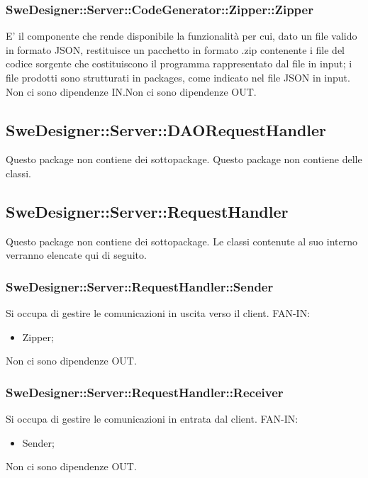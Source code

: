 \documentclass[../PianoDiQualifica.tex]{subfiles}
\begin{document}
		\subsubsection{SweDesigner::Server::CodeGenerator::Zipper::Zipper}
		E' il componente che rende disponibile la funzionalità per cui, dato un file valido in formato JSON, restituisce un pacchetto in formato .zip contenente i file del codice sorgente che costituiscono il programma rappresentato dal file in input; i file prodotti sono strutturati in packages, come indicato nel file JSON in input.
		Non ci sono dipendenze IN.Non ci sono dipendenze OUT.\subsection{SweDesigner::Server::DAORequestHandler}
		Questo package non contiene dei sottopackage.
		Questo package non contiene delle classi.
		\subsection{SweDesigner::Server::RequestHandler}
		Questo package non contiene dei sottopackage.
		Le classi contenute al suo interno verranno elencate qui di seguito.
		\subsubsection{SweDesigner::Server::RequestHandler::Sender}
		Si occupa di gestire le comunicazioni in uscita verso il client.
		FAN-IN:
		\begin{itemize}
			\item Zipper;
		\end{itemize}
		Non ci sono dipendenze OUT.\subsubsection{SweDesigner::Server::RequestHandler::Receiver}
		Si occupa di gestire le comunicazioni in entrata dal client.
		FAN-IN:
		\begin{itemize}
			\item Sender;
		\end{itemize}
		Non ci sono dipendenze OUT.
\end{document}
